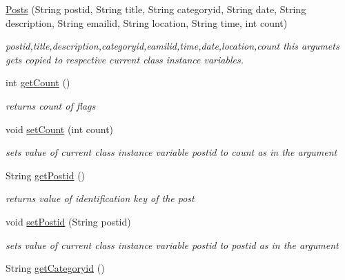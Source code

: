 \begin{DoxyCompactItemize}
\item 
\hyperlink{classcom_1_1example_1_1sel_1_1lostfound_1_1Posts_af3a9099edc398eec8b8377e6438e94d1}{Posts} (String postid, String title, String categoryid, String date, String description, String emailid, String location, String time, int count)
\begin{DoxyCompactList}\small\item\em postid,title,description,categoryid,eamilid,time,date,location,count this argumets gets copied to respective current class instance variables. \end{DoxyCompactList}\item 
int \hyperlink{classcom_1_1example_1_1sel_1_1lostfound_1_1Posts_ab547a661789fd2b3b7ef0c8c2980de43}{get\+Count} ()\hypertarget{classcom_1_1example_1_1sel_1_1lostfound_1_1Posts_ab547a661789fd2b3b7ef0c8c2980de43}{}\label{classcom_1_1example_1_1sel_1_1lostfound_1_1Posts_ab547a661789fd2b3b7ef0c8c2980de43}

\begin{DoxyCompactList}\small\item\em returns count of flags \end{DoxyCompactList}\item 
void \hyperlink{classcom_1_1example_1_1sel_1_1lostfound_1_1Posts_a9e51f4b1317ea5716c213f2a44aa4374}{set\+Count} (int count)
\begin{DoxyCompactList}\small\item\em sets value of current class instance variable postid to count as in the argument \end{DoxyCompactList}\item 
String \hyperlink{classcom_1_1example_1_1sel_1_1lostfound_1_1Posts_ad3be37a34fadcbf1b1d27d58a689f88a}{get\+Postid} ()\hypertarget{classcom_1_1example_1_1sel_1_1lostfound_1_1Posts_ad3be37a34fadcbf1b1d27d58a689f88a}{}\label{classcom_1_1example_1_1sel_1_1lostfound_1_1Posts_ad3be37a34fadcbf1b1d27d58a689f88a}

\begin{DoxyCompactList}\small\item\em returns value of identification key of the post \end{DoxyCompactList}\item 
void \hyperlink{classcom_1_1example_1_1sel_1_1lostfound_1_1Posts_a75c83d60e892880de5b3e22224374739}{set\+Postid} (String postid)
\begin{DoxyCompactList}\small\item\em sets value of current class instance variable postid to postid as in the argument \end{DoxyCompactList}\item 
String \hyperlink{classcom_1_1example_1_1sel_1_1lostfound_1_1Posts_a16378dcdf5752029dd2b347640e08ad6}{get\+Categoryid} ()\hypertarget{classcom_1_1example_1_1sel_1_1lostfound_1_1Posts_a16378dcdf5752029dd2b347640e08ad6}{}\label{classcom_1_1example_1_1sel_1_1lostfound_1_1Posts_a16378dcdf5752029dd2b347640e08ad6}


\end{DoxyCompactItemize}
